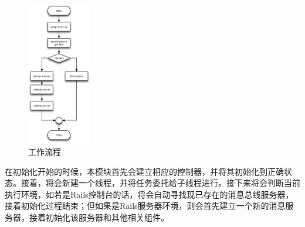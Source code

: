 \begin{figure}[h]
\centering
\includegraphics[width=0.25\textwidth]{images/detail/gem_process.eps}
\caption{工作流程}
\label{fig-gem-process}
\end{figure}

在初始化开始的时候，本模块首先会建立相应的控制器，并将其初始化到正确状态。接着，将会新建一个线程，并将任务委托给子线程进行。接下来将会判断当前执行环境，如若是Rails控制台的话，将会自动寻找现已存在的消息总线服务器，接着初始化过程结束；但如果是Rails服务器环境，则会首先建立一个新的消息服务器，接着初始化该服务器和其他相关组件。

